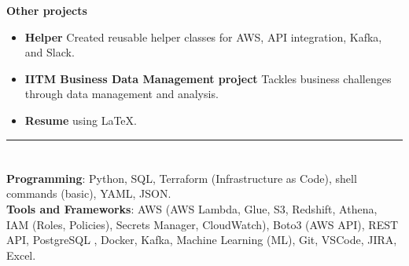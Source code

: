 \documentclass[a4paper,10pt]{article}
\begin{document}
\textbf{Other projects}
\vspace{-2mm}
\begin{itemize}
    \item \textbf{Helper} \href{https://github.com/ShreehariA/helpers}{} Created reusable helper classes for AWS, API integration, Kafka, and Slack.
    \vspace{-2mm}
    \item \textbf{IITM Business Data Management project} \href{https://github.com/ShreehariA/IITM_BDM_Project}{} Tackles business challenges through data management and analysis.
    \vspace{-2mm}
    \item \textbf{Resume} \href{https://github.com/ShreehariA/Resume}{} using LaTeX.
\end{itemize}

\hrule
\section{\scshape\color{Fuchsia}{\faTools\ \textbf TECHNICAL SKILLS}}
\textbf{Programming}: Python, SQL, Terraform (Infrastructure as Code), shell commands (basic), YAML, JSON. \\
\textbf{Tools and Frameworks}: AWS (AWS Lambda, Glue, S3, Redshift, Athena, IAM (Roles, Policies), Secrets Manager, CloudWatch), Boto3 (AWS API), REST API, PostgreSQL
, Docker, Kafka, Machine Learning (ML), Git, VSCode, JIRA, Excel.
\end{document}
